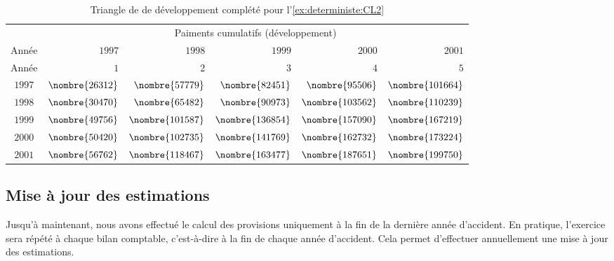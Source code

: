 \begin{exemple}
  \begin{table}
    \centering
    \caption{Triangle de de développement complété pour
      l'\autoref{ex:deterministe:CL2}}
    \label{tab:deterministe:CL2:complet}
    \begin{tabular}{crrrrr}
      \toprule
      & \multicolumn{5}{c}{Paiments cumulatifs (développement)} \\
      Année & $1997$ & $1998$ & $1999$ & $2000$ & $2001$  \\
      \midrule
      Année & $1$ & $2$ & $3$ & $4$ & $5$  \\ \hline
      $1997$ & $\nombre{26312}$ & $\nombre{57779}$  & $\nombre{82451}$  & $\nombre{95506}$  & $\nombre{101664}$\\
      $1998$ & $\nombre{30470}$ & $\nombre{65482}$  & $\nombre{90973}$  & $\nombre{103562}$ & $\nombre{110239}$\\
      $1999$ & $\nombre{49756}$ & $\nombre{101587}$ & $\nombre{136854}$ & $\nombre{157090}$ & $\nombre{167219}$\\
      $2000$ & $\nombre{50420}$ & $\nombre{102735}$ & $\nombre{141769}$ & $\nombre{162732}$ & $\nombre{173224}$\\
      $2001$ & $\nombre{56762}$ & $\nombre{118467}$ & $\nombre{163477}$ & $\nombre{187651}$ & $\nombre{199750}$ \\
      \bottomrule
    \end{tabular}
  \end{table}
\end{exemple}

\subsection{Mise à jour des estimations}
\label{sec:deterministe:CL:maj}

Jusqu'à maintenant, nous avons effectué le calcul des provisions
uniquement à la fin de la dernière année d'accident. En pratique,
l'exercice sera répété à chaque bilan comptable, c'est-à-dire à la fin
de chaque année d'accident. Cela permet d'effectuer annuellement une
mise à jour des estimations.

